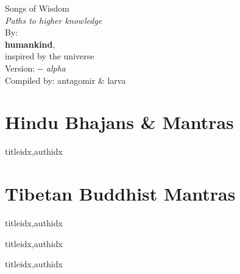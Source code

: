 \documentclass[twoside,10pt]{book}
\begin{document}
  \begin{titlepage}
    
    \thispagestyle{empty}
    \vspace*{\fill}    
    \begin{center}
      \Huge Songs of Wisdom\\
      \normalsize \textit{Paths to higher knowledge}\\
      \Large
      \vspace{3em}
      By:\\
      \textbf{humankind},\\
      inspired by the universe \\
      \vspace{1em}
      Version: \the\year-\the\month-\the\day \textit{ alpha}
      \\
      \vspace*{\fill}
      \let\thefootnote\relax{\scriptsize Compiled by: antagomir \& larva}
    \end{center}    
  \end{titlepage}
  
  \tableofcontents %

  \clearpage\scleardpage
    \section{Hindu Bhajans \& Mantras} 
      \begin{songs}{titleidx,authidx}
        \setcounter{songnum}{100}
        
      \end{songs}
     \scleardpage
    \section{Tibetan Buddhist Mantras}
      \begin{songs}{titleidx,authidx}
        \setcounter{songnum}{170}
        
      \end{songs}  
  
  \clearpage\scleardpage
    \begin{songs}{titleidx,authidx}
      \setcounter{songnum}{200}
      
    \end{songs}
    
  \clearpage\scleardpage    
    \begin{songs}{titleidx,authidx}
      \setcounter{songnum}{300}
      
    \end{songs}
  
\end{document}
